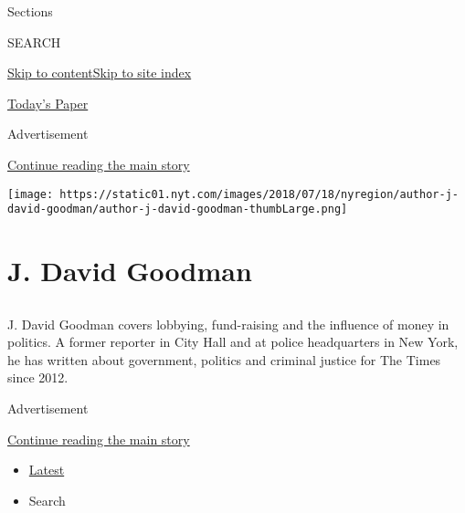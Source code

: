 Sections

SEARCH

\protect\hyperlink{site-content}{Skip to
content}\protect\hyperlink{site-index}{Skip to site index}

\href{https://myaccount.nytimes.com/auth/login?response_type=cookie\&client_id=vi}{}

\href{https://www.nytimes.com/section/todayspaper}{Today's Paper}

Advertisement

\protect\hyperlink{after-top}{Continue reading the main story}

\texttt{[image: https://static01.nyt.com/images/2018/07/18/nyregion/author-j-david-goodman/author-j-david-goodman-thumbLarge.png]}

\hypertarget{j-david-goodman}{%
\section{J. David Goodman}\label{j-david-goodman}}

\subsection{}

J. David Goodman covers lobbying, fund-raising and the influence of
money in politics. A former reporter in City Hall and at police
headquarters in New York, he has written about government, politics and
criminal justice for The Times since 2012.

Advertisement

\protect\hyperlink{after-mid1}{Continue reading the main story}

\begin{itemize}
\tightlist
\item
  \protect\hyperlink{stream-panel}{Latest}
\item
  Search
\end{itemize}

